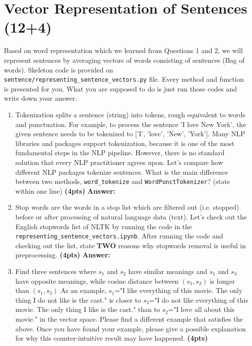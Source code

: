\documentclass{assignment format}
\newenvironment{answer}{
    {\bf Answer:} \begingroup\color{red}
}{\endgroup}%
\begin{document}
\section{Vector Representation of Sentences (12+4)}
Based on word representation which we learned from Questions 1 and 2, we will represent sentences by averaging vectors of words consisting of sentences (Bag of words). Skeleton code is provided on \texttt{sentence/}\texttt{representing}\newline\texttt{\_sentence}\texttt{\_vectors.py} file. Every method and function is presented for you. What you are supposed to do is just run those codes and write down your answer.
\begin{enumerate}[label=(\alph*)]
\item Tokenization splits a sentence (string) into tokens, rough equivalent to words and punctuation. For example, to process the sentence 'I love New York', the given sentence needs to be tokenized to ['I', 'love', 'New', 'York']. Many NLP libraries and packages support tokenization, because it is one of the most fundamental steps in the NLP pipeline. However, there is no standard solution that every NLP practitioner agrees upon. Let's compare how different NLP packages tokenize sentences.
\newline
What is the main difference between two methods, \texttt{word\_tokenize} and \texttt{WordPunctTokenizer}? (state within one line) \textbf{(4pts)}
\begin{answer}
\end{answer}
\item Stop words are the words in a stop list which are filtered out (i.e. stopped) before or after processing of natural language data (text). Let's check out the English stopwords list of NLTK by running the code in the \texttt{representing\_sentence\_vectors.ipynb}.
\newline
After running the code and checking out the list, state \textbf{TWO} reasons why stopwords removal is useful in preprocessing. \textbf{(4pts)}
\begin{answer}
\end{answer}
\item 
Find three sentences where $s_1$ and $s_2$ have similar meanings and $s_1$ and $s_3$ have opposite meanings, while cosine distance between $(s_1, s_2)$ is longer than $(s_1, s_3)$  
As an example, $s_1$="I like everything of this movie. The only thing I do not like is the cast." is closer to $s_3$="I do not like everything of this movie. The only thing I like is the cast." than to $s_2$="I love all about this movie." in the vector space. Please find a different example that satisfies the above. Once you have found your example, please give a possible explanation for why this counter-intuitive result may have happened.
\textbf{(4pts)}


\end{enumerate}
\end{document}
